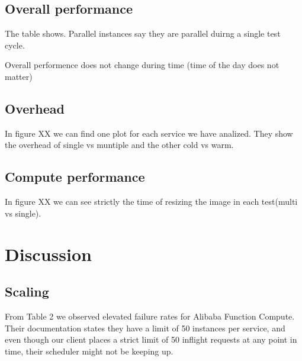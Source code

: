 \documentclass[11pt]{article}
\begin{document}

\subsection{Overall performance}

The table shows. Parallel instances say they are parallel duirng a single test cycle.


Overall performence does not change during time (time of the day does not matter)

\subsection{Overhead}

In figure XX we can find one plot for each service we have analized. They show the overhead of single vs muntiple and the other cold vs warm.




\subsection{Compute performance}

In figure XX we can see strictly the time of resizing the image in each test(multi vs single).




\section{Discussion}

\subsection{Scaling}
From Table 2 %
we observed elevated failure rates for Alibaba Function Compute.
Their documentation %
states they have a limit of 50 instances per service,
and even though our client places a strict limit of 50 inflight requests at any point in time,
their scheduler might not be keeping up.
\end{document}
